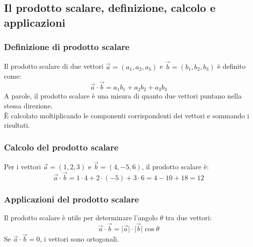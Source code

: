 \documentclass{article}
\begin{document}

\newpage
\subsection{Il prodotto scalare, definizione, calcolo e applicazioni}

\subsubsection{Definizione di prodotto scalare}
Il prodotto scalare di due vettori \(\vec{a} = (a_1, a_2, a_3)\) e
\(\vec{b} = (b_1, b_2, b_3)\) è definito come:
\[
    \vec{a} \cdot \vec{b} = a_1 b_1 + a_2 b_2 + a_3 b_3
\]
A parole, il prodotto scalare è una misura di quanto due vettori puntano nella stessa
direzione.\\
È calcolato moltiplicando le componenti corrispondenti dei vettori e sommando i risultati.


\subsubsection{Calcolo del prodotto scalare}
Per i vettori \(\vec{a} = (1, 2, 3)\) e \(\vec{b} = (4, -5, 6)\), il prodotto scalare è:
\[
    \vec{a} \cdot \vec{b} = 1 \cdot 4 + 2 \cdot (-5) + 3 \cdot 6 = 4 - 10 + 18 = 12
\]

\subsubsection{Applicazioni del prodotto scalare}
Il prodotto scalare è utile per determinare l'angolo \(\theta\) tra due vettori:
\[
    \vec{a} \cdot \vec{b} = \lvert\vec{a}\rvert \cdot \lvert\vec{b}\rvert \cos \theta
\]
Se \(\vec{a} \cdot \vec{b} = 0\), i vettori sono ortogonali.

\end{document}

